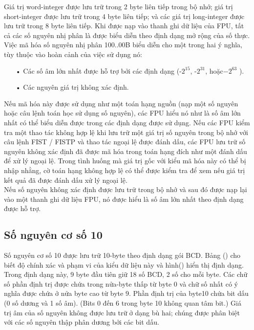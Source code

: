 	Giá trị word-integer được lưu trữ trong 2 byte liên tiếp trong bộ nhớ; giá trị short-integer được lưu trữ trong 4 byte liên tiếp; và các giá trị long-integer được lưu trữ trong 8 byte liên tiếp. Khi được nạp vào thanh ghi dữ liệu của FPU, tất cả các số nguyên nhị phân là được biểu diễn theo định dạng mở rộng của số thực.\\
	
	Việc mã hóa số nguyên nhị phân 100..00B biểu diễn cho một trong hai ý nghĩa, tùy thuộc vào hoàn cảnh của việc sử dụng nó: 
	\begin{itemize}
		\item[•] Các số âm lớn nhất được hỗ trợ bởi các định dạng (-$2^{15}$, -$2^{31}$, hoặc$ -2^{63}$ ).
		 \item[•] Các nguyên giá trị không xác định.
	\end{itemize}

			Nếu mã hóa này được sử dụng như một toán hạng nguồn (nạp một số nguyên hoặc câu lệnh toán học sử dụng số nguyên), các FPU hiểu nó như là số âm lớn nhất có thể biểu diễn được trong các định dạng được sử dụng. Nếu các FPU kiểm tra một thao tác không hợp lệ khi lưu trữ một giá trị số nguyên trong bộ nhớ với câu lệnh FIST / FISTP và thao tác ngoại lệ được đánh dấu, các FPU lưu trữ số nguyên không xác định đã được mã hóa trong toán hạng đích như một đánh dấu để xử lý ngoại lệ. Trong tình huống mà giá trị gốc với kiểu mã hóa này có thể bị nhập nhằng, cờ toán hạng không hợp lệ có thể được kiểm tra để xem nếu giá trị kết quả đã được đánh dấu xử lý ngoại lệ. \\
	
		Nếu số nguyên không xác định được lưu trữ trong bộ nhớ và sau đó được nạp lại vào một thanh ghi dữ liệu FPU, nó được hiểu là số âm lớn nhất theo định dạng được hỗ trợ.
		
		\subsection*{Số nguyên cơ số 10}
		Số nguyên cơ số 10 được lưu trữ 10-byte theo định dạng gói BCD. Bảng () cho biết độ chính xác và phạm vi của kiểu dữ liệu này và hình() hiển thị định dạng. Trong định dạng này, 9 byte đầu tiên giữ 18 số BCD, 2 số cho mỗi byte. Các chữ số phần định trị được chứa trong nửa-byte thấp từ byte 0 và chữ số nhất có ý nghĩa được chứa ở nửa byte cao từ byte 9. Phần định trị của byte10 chứa bit dấu (0 số dương và 1 số âm). (Bits 0 đến 6 trong byte 10 không quan tâm bit.) Giá trị âm của số nguyên không được lưu trữ ở dạng bù hai; chúng được phân biệt với các số nguyên thập phân dương bởi các bit dấu.\\
		
